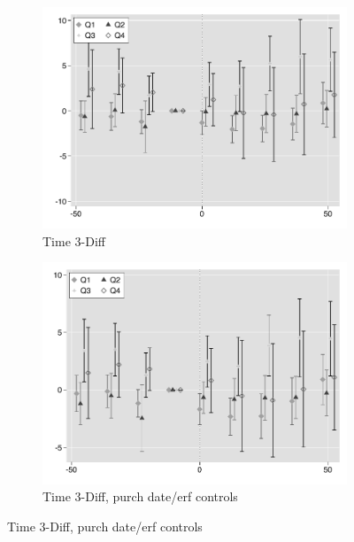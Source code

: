 \documentclass[12pt]{article}
\begin{document}
\begin{figure}
\centering
   \caption[ Transaction frequency over time ]
    {\small Transaction frequency over time} 
 \begin{subfigure}[b]{0.48\textwidth}
                    \caption[Network2]%
            {{\footnotesize Time 3-Diff}}    
            \label{fig:prefor}
            \centering
            \includegraphics[width=\textwidth,trim={0.3cm .3cm 0.1cm 0cm}, clip=true]{figures/freq_time_3d_no_ctrl_q}
        \end{subfigure}
        \hfill
        \begin{subfigure}[b]{0.48\textwidth}
                    \caption[Network2]%
            {{\footnotesize Time 3-Diff, purch date/erf controls}}    
            \label{fig:prefor}
            \centering
            \includegraphics[width=\textwidth,trim={0.3cm .3cm 0.1cm 0cm}, clip=true]{figures/freq_time_3d_ctrl_q}

\end{subfigure}
\end{figure}
\end{document}
